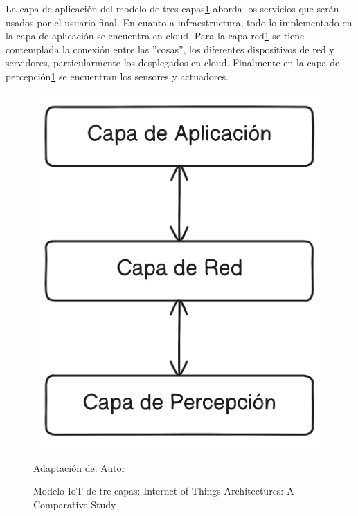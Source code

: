 \documentclass[stu,12pt,floatsintext]{apa7}
\begin{document}
	La capa de aplicación del modelo de tres capas\ref{iot_tres_capas} aborda los servicios que serán usados por el usuario final. En cuanto a infraestructura, todo lo implementado en la capa de aplicación se encuentra en cloud.
	Para la capa red\ref{iot_tres_capas} se tiene contemplada la conexión entre las ''cosas'', los diferentes dispositivos de red y servidores, particularmente los desplegados en cloud.
	Finalmente en la capa de percepción\ref{iot_tres_capas} se encuentran los sensores y actuadores.
		\begin{figure}[H]
		\centering
		\includegraphics[scale=0.3]{iot_modelo_3_capas}
		\captionsetup{justification=centering}
		\caption{Modelo IoT de tre capas: Internet of Things Architectures: A Comparative Study}
		\small
		\label{iot_tres_capas}
		Adaptación de: Autor
	\end{figure}
	
\end{document}
